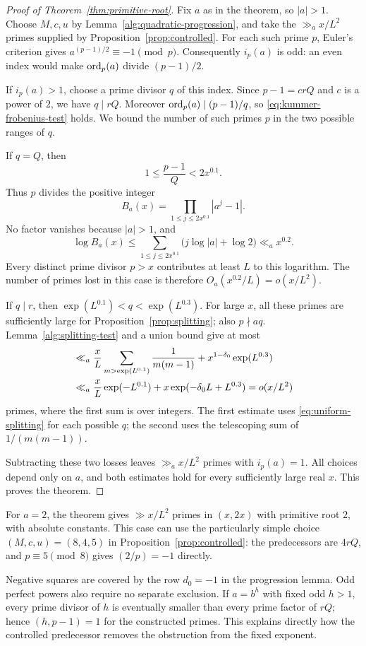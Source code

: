 \begin{proof}[Proof of Theorem~\ref{thm:primitive-root}]
Fix $a$ as in the theorem, so $|a|>1$. Choose $M,c,u$ by
Lemma~\ref{alg:quadratic-progression}, and take the
$\gg_a x/L^2$ primes supplied by Proposition~\ref{prop:controlled}.
For each such prime $p$, Euler's criterion gives
$a^{(p-1)/2}\equiv-1\pmod p$. Consequently $i_p(a)$ is odd: an even
index would make $\operatorname{ord}_p(a)$ divide $(p-1)/2$.

If $i_p(a)>1$, choose a prime divisor $q$ of this index. Since
$p-1=crQ$ and $c$ is a power of $2$, we have $q\mid rQ$. Moreover
$\operatorname{ord}_p(a)\mid(p-1)/q$, so \eqref{eq:kummer-frobenius-test} holds.
We bound the number of such primes $p$ in the two possible ranges of $q$.

If $q=Q$, then
\[
 1\le\frac{p-1}{Q}<2x^{0.1}.
\]
Thus $p$ divides the positive integer
\[
 B_a(x)=\prod_{1\le j\le2x^{0.1}}|a^j-1|.
\]
No factor vanishes because $|a|>1$, and
\[
 \log B_a(x)
 \le\sum_{1\le j\le2x^{0.1}}\bigl(j\log|a|+\log2\bigr)
 \ll_a x^{0.2}.
\]
Every distinct prime divisor $p>x$ contributes at least $L$ to this
logarithm. The number of primes lost in this case is therefore
$O_a(x^{0.2}/L)=o(x/L^2)$.

If $q\mid r$, then
$\exp(L^{0.1})<q<\exp(L^{0.3})$. For large $x$, all these primes are
sufficiently large for Proposition~\ref{prop:splitting}; also $p\nmid aq$.
Lemma~\ref{alg:splitting-test} and a union bound give at most
\begin{align}
 &\ll_a \frac{x}{L}
       \sum_{m>\exp(L^{0.1})}\frac1{m(m-1)}
       +x^{1-\delta_0}\exp(L^{0.3})\notag\\
 &\ll_a \frac{x}{L}\exp(-L^{0.1})
       +x\exp(-\delta_0L+L^{0.3})
       =o(x/L^2)
 \label{alg:exceptional-small-divisors}
\end{align}
primes, where the first sum is over integers. The first estimate uses
\eqref{eq:uniform-splitting} for each possible $q$; the second uses the
telescoping sum of $1/(m(m-1))$.

Subtracting these two losses leaves $\gg_a x/L^2$ primes with
$i_p(a)=1$. All choices depend only on $a$, and both estimates hold for
every sufficiently large real $x$. This proves the theorem.
\end{proof}

For $a=2$, the theorem gives $\gg x/L^2$ primes in $(x,2x)$ with
primitive root $2$, with absolute constants. This case can use the
particularly simple choice $(M,c,u)=(8,4,5)$ in
Proposition~\ref{prop:controlled}: the predecessors are $4rQ$, and
$p\equiv5\pmod8$ gives $(2/p)=-1$ directly.

\begin{remark}
Negative squares are covered by the row $d_0=-1$ in the progression
lemma. Odd perfect powers also require no separate exclusion. If
$a=b^h$ with fixed odd $h>1$, every prime divisor of $h$ is eventually
smaller than every prime factor of $rQ$; hence $(h,p-1)=1$ for the
constructed primes. This explains directly how the controlled
predecessor removes the obstruction from the fixed exponent.
\end{remark}
